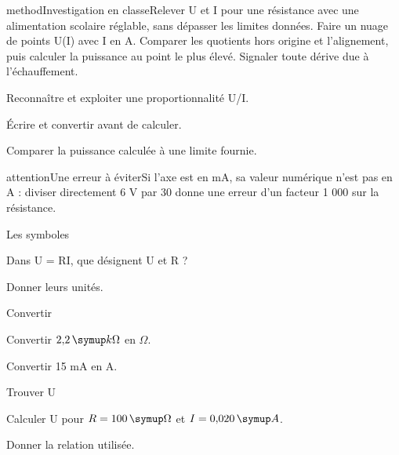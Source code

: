 \label{activite-14}
\begin{pcEncadre}{method}{Investigation en classe}Relever U et I pour une résistance avec une alimentation scolaire réglable, sans dépasser les limites données. Faire un nuage de points U(I) avec I en A. Comparer les quotients hors origine et l’alignement, puis calculer la puissance au point le plus élevé. Signaler toute dérive due à l’échauffement.\end{pcEncadre}
\begin{questions}
\item Reconnaître et exploiter une proportionnalité U/I.
\item Écrire et convertir avant de calculer.
\item Comparer la puissance calculée à une limite fournie.
\end{questions}
\begin{pcEncadre}{attention}{Une erreur à éviter}Si l’axe est en mA, sa valeur numérique n’est pas en A : diviser directement 6 V par 30 donne une erreur d’un facteur 1 000 sur la résistance.\end{pcEncadre}
\pcGrille
\clearpage{}
\par\noindent\begin{minipage}{\linewidth}
\begin{exercice}[1]{Les symboles}
\begin{questions}
\item Dans U = RI, que désignent U et R ?
\item Donner leurs unités.
\end{questions}
\end{exercice}
\end{minipage}
\par\noindent\begin{minipage}{\linewidth}
\begin{exercice}[1]{Convertir}
\begin{questions}
\item Convertir $2{,}2\unite{k\Omega}$ en $\Omega$.
\item Convertir 15 mA en A.
\end{questions}
\end{exercice}
\end{minipage}
\par\noindent\begin{minipage}{\linewidth}
\begin{exercice}[1]{Trouver U}
\begin{questions}
\item Calculer U pour $R=100\unite\Omega$ et $I=0{,}020\unite A$.
\item Donner la relation utilisée.
\end{questions}
\end{exercice}
\end{minipage}
